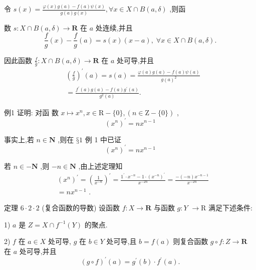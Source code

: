 令 $s\left( x\right)  = \frac{\varphi \left( x\right) g\left( a\right)  - f\left( a\right) \psi \left( x\right) }{g\left( a\right) g\left( x\right) },\forall x \in  X \cap  B\left( {a,\delta }\right)$ ,则函

数 $s : X \cap  B\left( {a,\delta }\right)  \rightarrow  \mathbf{R}$ 在 $a$ 处连续,并且
$$\frac{f}{g}\left( x\right)  - \frac{f}{g}\left( a\right)  = s\left( x\right) \left( {x - a}\right) ,\;\forall x \in  X \cap  B\left( {a,\delta }\right) .$$

因此函数 $\frac{f}{g} : X \cap  B\left( {a,\delta }\right)  \rightarrow  \mathbf{R}$ 在 $a$ 处可导,并且
\begin{align*}
	&{\left( \frac{f}{g}\right) }^{\prime }\left( a\right)  = s\left( a\right)  = \frac{\varphi \left( a\right) g\left( a\right)  - f\left( a\right) \psi \left( a\right) }{g{\left( a\right) }^{2}}\\
	&= \frac{{f}^{\prime }\left( a\right) g\left( a\right)  - f\left( a\right) {g}^{\prime }\left( a\right) }{{g}^{2}\left( a\right) }.
\end{align*}

例1 证明: 对函 数 $x \mapsto  {x}^{n},x \in  \mathrm{R} - \{ 0\} ,\left( {n \in  \mathrm{Z}-\{ 0\} }\right)$ ,
$${\left( {x}^{n}\right) }^{\prime } = n{x}^{n - 1}$$

事实上,若 $n \in  \mathbf{N}$ ,则在 $§1$ 例 1 中已证
$${\left( {x}^{n}\right) }^{\prime } = n{x}^{n - 1}$$

若 $n \in   - \mathbf{N}$ ,则 $- n \in  \mathbf{N}$ ,由上述定理知
\begin{align*}
	&{\left( {x}^{n}\right) }^{\prime } = {\left( \frac{1}{{x}^{-n}}\right) }^{\prime } = \frac{{1}^{\prime } \cdot  {x}^{-n} - 1 \cdot  {\left( {x}^{-n}\right) }^{\prime }}{{x}^{-{2n}}} = \frac{-\left( {-n}\right) {x}^{-n - 1}}{{x}^{-{2n}}}\\
	&= n{x}^{n - 1}\text{ . }
\end{align*}

定理 $6 \cdot  2 \cdot  2$ (复合函数的导数) 设函数 $f : X \rightarrow  \mathbf{R}$ 与函数 $g : Y$  $\rightarrow  \mathrm{R}$ 满足下述条件:

1) $a$ 是 $Z = X \cap  {f}^{-1}\left( Y\right)$ 的聚点.

2) $f$ 在 $a \in  X$ 处可导, $g$ 在 $b \in  Y$ 处可导,且 $b = f\left( a\right)$ 则复合函数 $g \circ  f : Z \rightarrow  \mathbf{R}$ 在 $a$ 处可导,并且
$${\left( g \circ  f\right) }^{\prime }\left( a\right)  = {g}^{\prime }\left( b\right)  \cdot  {f}^{\prime }\left( a\right) .$$

